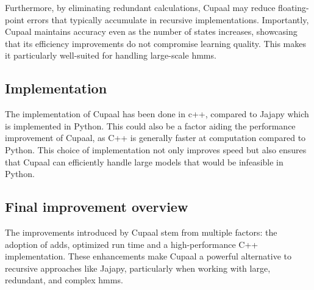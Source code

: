 Furthermore, by eliminating redundant calculations, Cupaal may reduce floating-point errors that typically accumulate in recursive implementations.
Importantly, Cupaal maintains accuracy even as the number of states increases, showcasing that its efficiency improvements do not compromise learning quality.
This makes it particularly well-suited for handling large-scale \glspl{hmm}.


\subsection{Implementation}\label{subsec:improvements_implementation}
The implementation of Cupaal has been done in c++, compared to Jajapy which is implemented in Python.
This could also be a factor aiding the performance improvement of Cupaal, as C++ is generally faster at computation compared to Python.
This choice of implementation not only improves speed but also ensures that Cupaal can efficiently handle large models that would be infeasible in Python.

\subsection{Final improvement overview}\label{improvements_overview}
The improvements introduced by Cupaal stem from multiple factors: the adoption of \glspl{add}, optimized run time and a high-performance C++ implementation.
These enhancements make Cupaal a powerful alternative to recursive approaches like Jajapy, particularly when working with large, redundant, and complex \glspl{hmm}.





